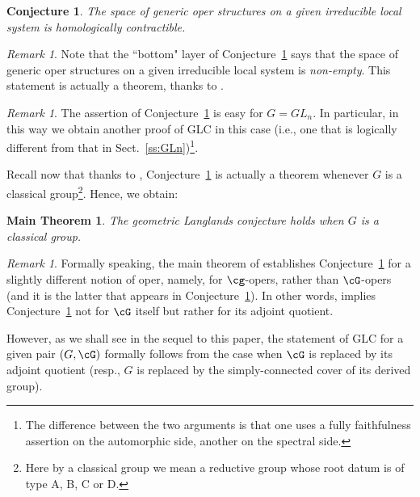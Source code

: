 \documentclass[9pt]{amsart}
\newtheorem{conj}[subsubsection]{Conjecture}
\newtheorem{mainthm}[subsubsection]{Main Theorem}
\theoremstyle{remark}
\newtheorem{rem}[subsubsection]{Remark}
\theoremstyle{definition}
\theoremstyle{remark}
\newcommand{\secref}[1]{Sect.~\ref{#1}}
\newcommand{\conjref}[1]{Conjecture~\ref{#1}}
\numberwithin{equation}{section}
\begin{document}
\begin{conj} \label{c:oper contr}
The space of \emph{generic oper structures} on a given irreducible local system is homologically contractible. 
\end{conj} 

\begin{rem}
Note that the ``bottom" layer of \conjref{c:oper contr} says that the 
space of generic oper structures on a given irreducible local system is \emph{non-empty}.
This statement is actually a theorem, thanks to \cite{Ari}.
\end{rem} 
 
\begin{rem}
The assertion of \conjref{c:oper contr} is easy for $G=GL_n$. In particular, in this way we obtain another proof
of GLC in this case (i.e., one that is logically different from that in \secref{ss:GLn})\footnote{The difference between
the two arguments is that one uses a fully faithfulness assertion on the automorphic side, another on the spectral side.}.  

 
\end{rem} 

\sssec{}

Recall now that thanks to \cite{BKS}, \conjref{c:oper contr} is actually a theorem whenever $G$ is a 
classical group\footnote{Here by a classical group we mean a reductive group whose root datum is of
type A, B, C or D.}.  Hence, we obtain:

\begin{mainthm}  \label{t:GLC for class}
The geometric Langlands conjecture holds when $G$ is a classical group. 
\end{mainthm}

\begin{rem}
Formally speaking, the main theorem of \cite{BKS} establishes \conjref{c:oper contr} for a slightly different notion
of oper, namely, for $\cg$-opers, rather than $\cG$-opers (and it is the latter that appears in \conjref{c:oper contr}).
In other words, \cite{BKS} implies \conjref{c:oper contr} not for $\cG$ itself but rather for its adjoint quotient. 

\medskip

However, as we shall see in the sequel to this paper, the statement of GLC for a given pair $(G,\cG)$ formally follows
from the case when $\cG$ is replaced by its adjoint quotient (resp., $G$ is replaced by the simply-connected cover
of its derived group).  

\end{rem} 
\end{document}
